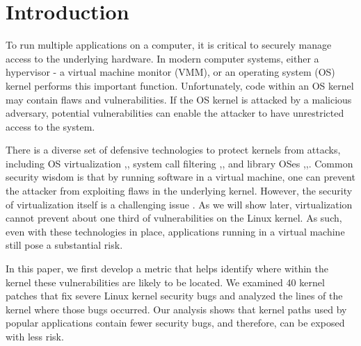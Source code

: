 \section{Introduction}
\label{sec.introduction}

To run multiple applications on a computer, it is critical to securely
manage access to the underlying hardware. In modern computer systems,
either a hypervisor - a virtual machine monitor (VMM), or an 
operating system (OS) kernel performs this important function. Unfortunately, code within an OS kernel may contain flaws and vulnerabilities. If the OS kernel is attacked by a malicious adversary, potential vulnerabilities can enable the attacker to have unrestricted access to the system.




There is a diverse set of defensive technologies to protect kernels from 
attacks, including OS virtualization \cite{Xen-03},\cite{Microsoft-Hyper-V}, system call filtering \cite{Janus0:96, Janus:99},\cite{SCI-04}, and library OSes \cite{Bascule},\cite{Drawbridge-11},\cite{Graphene-14}. Common security wisdom is that by running software in a virtual machine, 
one can prevent the attacker from exploiting flaws in the underlying kernel.  However, the security of virtualization itself is a 
challenging issue \cite{Tal}. As we will show later, virtualization cannot prevent about one third of vulnerabilities on the Linux kernel. As such, even with these technologies in place, applications running in a virtual machine still pose a substantial risk.

In this paper, we first develop a metric that helps identify where
within the kernel these vulnerabilities are likely to be located. We
examined 40 kernel patches that fix severe Linux kernel security bugs
and analyzed the lines of the kernel where those bugs occurred.  Our
analysis shows that kernel paths used by popular applications contain fewer
security bugs, and therefore, can be exposed with less risk. 

